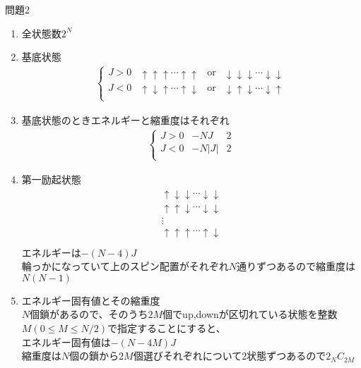 \documentclass[fleqn]{jbook}
\begin{document}
\begin{answer}{問題2}{}
\begin{enumerate}
\item 全状態数$2^{N}$
\item 基底状態
\begin{eqnarray*}
\left\{
\begin{array}{cccc}
J>0 & \uparrow   \uparrow   \uparrow   \cdots \uparrow   \uparrow   & \mathrm{or} &
      \downarrow \downarrow \downarrow \cdots \downarrow \downarrow \\

J<0 & \uparrow   \downarrow \uparrow   \cdots \uparrow   \downarrow & \mathrm{or} &
      \downarrow \uparrow   \downarrow \cdots \downarrow \uparrow   \\
\end{array}
\right.
\end{eqnarray*}
\item 基底状態のときエネルギーと縮重度はそれぞれ
\begin{eqnarray*}
\left\{
\begin{array}{ccc}
J>0 & -NJ   & 2\\
J<0 & -N|J| & 2\\
\end{array}
\right.
\end{eqnarray*}
\item 第一励起状態
\begin{eqnarray*}
\begin{array}{c}
\uparrow \downarrow \downarrow \cdots   \downarrow \downarrow\\
\uparrow \uparrow   \downarrow \cdots   \downarrow \downarrow\\
\vdots\\
\uparrow \uparrow   \uparrow   \cdots   \uparrow   \downarrow\\
\end{array}
\end{eqnarray*}
エネルギーは$-(N-4)J$\\
輪っかになっていて上のスピン配置がそれぞれ$N$通りずつあるので縮重度は$N(N-1)$
\item エネルギー固有値とその縮重度\\
$N$個鎖があるので、そのうち$2M$個でup,downが区切れている状態を整数$M(0\le M \le N/2)$で指定することにすると、\\
エネルギー固有値は$-(N-4M)J$\\
縮重度は$N$個の鎖から$2M$個選びそれぞれについて2状態ずつあるので$2_{N}C_{2M}$\\

\end{enumerate}
\end{answer}
\end{document}
